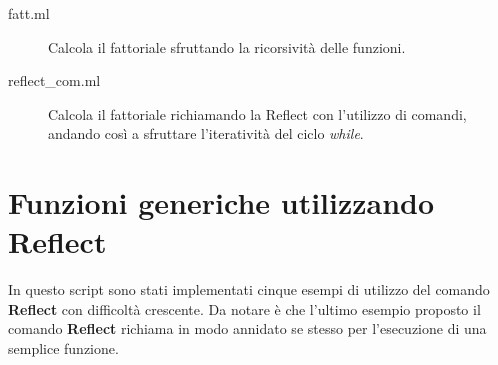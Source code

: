 \documentclass[a4paper,titlepage]{book}
\begin{document}
\begin{description}
\item[fatt.ml] Calcola il fattoriale sfruttando la ricorsivit\`a delle funzioni.
\item[reflect\_com.ml] Calcola il fattoriale richiamando la Reflect con l'utilizzo di comandi, andando cos\`i a sfruttare l'iterativit\`a del ciclo \textit{while}.
\end{description}

\section{Funzioni generiche utilizzando Reflect}
In questo script sono stati implementati cinque esempi di utilizzo del comando \textbf{Reflect} con difficolt\`a crescente.
Da notare \`e che l'ultimo esempio proposto il comando \textbf{Reflect} richiama in modo annidato se stesso per l'esecuzione di una semplice funzione.
\end{document}
